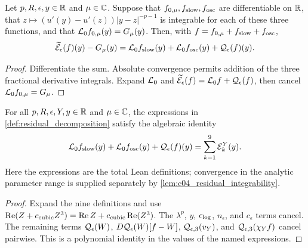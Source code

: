 \begin{lemma}
  \label{lem:c04_residual_linear_identity}
  Let $p,R,\epsilon,y\in\mathbb{R}$ and $\mu\in\mathbb{C}$. Suppose that
  $f_{0,\mu},f_{\textup{slow}},f_{\textup{osc}}$ are differentiable on $\mathbb{R}$,
  that $z\mapsto(u'(y)-u'(z))|y-z|^{-p-1}$ is integrable for each of these three functions,
  and that $\mathcal{L}_0f_{0,\mu}(y)=G_\mu(y)$. Then, with
  $f=f_{0,\mu}+f_{\textup{slow}}+f_{\textup{osc}}$,
  \[
    \widetilde{\mathcal{E}}_\epsilon(f)(y)-G_\mu(y)
      =\mathcal{L}_0f_{\textup{slow}}(y)+\mathcal{L}_0f_{\textup{osc}}(y)+\mathcal{Q}_\epsilon(f)(y).
  \]
\end{lemma}
\begin{proof}
  Differentiate the sum. Absolute convergence permits addition of the three fractional
  derivative integrals. Expand $\mathcal{L}_0$ and
  $\widetilde{\mathcal{E}}_\epsilon(f)=\mathcal{L}_0f+\mathcal{Q}_\epsilon(f)$, then cancel $\mathcal{L}_0f_{0,\mu}=G_\mu$.
\end{proof}

\begin{lemma}
  \label{lem:c04_residual_sum_algebra}
  For all $p,R,\epsilon,Y,y\in\mathbb{R}$ and $\mu\in\mathbb{C}$, the expressions in
  \cref{def:residual_decomposition} satisfy the algebraic identity
  \[
    \mathcal{L}_0f_{\textup{slow}}(y)+\mathcal{L}_0f_{\textup{osc}}(y)+\mathcal{Q}_\epsilon(f)(y)
      =\sum_{k=1}^9\mathcal{E}_k^Y(y).
  \]
  Here the expressions are the total Lean definitions; convergence in the analytic
  parameter range is supplied separately by \cref{lem:c04_residual_integrability}.
\end{lemma}
\begin{proof}
  Expand the nine definitions and use
  $\operatorname{Re}(Z+c_{\textup{cubic}}Z^3)
   =\operatorname{Re}Z+c_{\textup{cubic}}\operatorname{Re}(Z^3)$.
  The $\lambda^p$, $y$, $c_{\textup{log}}$, $n_\epsilon$, and $c_\epsilon$ terms cancel.
  The remaining terms $\mathcal{Q}_\epsilon(W)$, $D\mathcal{Q}_\epsilon(W)[f-W]$,
  $\mathcal{Q}_{\epsilon,3}(v_Y)$, and $\mathcal{Q}_{\epsilon,3}(\chi_Y f)$ cancel pairwise.
  This is a polynomial identity in the values of the named expressions.
\end{proof}

